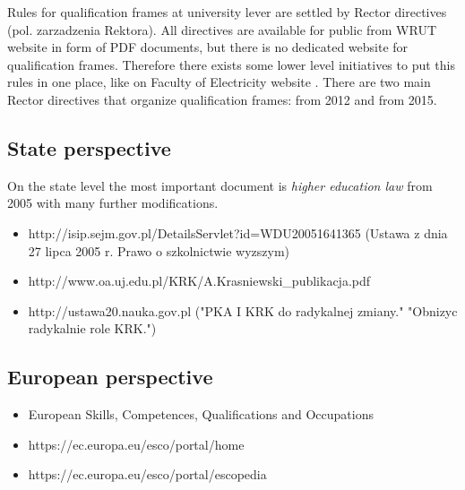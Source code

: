 \documentclass[printmode]{mgr}
\begin{document}
Rules for qualification frames at university lever are settled by Rector
directives (pol. zarzadzenia Rektora). All directives are available for public
from WRUT website in form of PDF documents, but there is no dedicated website
for qualification frames. Therefore there exists some lower level initiatives
to put this rules in one place, like on Faculty of Electricity website
\cite{web:weny-krk}. There are two main Rector directives that organize
qualification frames: from 2012\cite{web:2012-krk} and from
2015\cite{web:2015-krk}.

\subsection{State perspective}
On the state level the most important document is \textit{higher education
law} from 2005 with many further modifications.
\begin{itemize}
  \item http://isip.sejm.gov.pl/DetailsServlet?id=WDU20051641365
    (Ustawa z dnia 27 lipca 2005 r. Prawo o szkolnictwie wyzszym)
  \item http://www.oa.uj.edu.pl/KRK/A.Krasniewski\_publikacja.pdf
  \item http://ustawa20.nauka.gov.pl
    ("PKA I KRK do radykalnej zmiany."
    "Obnizyc radykalnie role KRK.")
\end{itemize}

\subsection{European perspective}
\begin{itemize}
  \item European Skills, Competences, Qualifications and Occupations
  \item https://ec.europa.eu/esco/portal/home
  \item https://ec.europa.eu/esco/portal/escopedia
\end{itemize}

\end{document}
